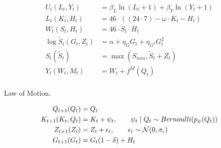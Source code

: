 \begin{align}
    U_t(L_t, Y_t) &= \beta_L \ln(L_t + 1) + \beta_Y \ln(Y_t + 1) \label{eq:utility_v1}\\
    L_t(K_t, H_t) &= 46 \cdot ((24 \cdot 7) - \omega \cdot K_t  - H_t) \label{eq:leissure_v1}\\
    W_t(S_t, H_t) &= 46 \cdot S_t \cdot H_t \label{eq:wage_v1}\\
    \log \tilde{S}_t (G_t, Z_t) &= \alpha + \eta_G G_t + \eta_{G^2} G_t^2 \label{eq:salary_tilde_v1}\\
    S_t(\tilde{S}_t) &= \max(S_{min} , \tilde{S}_t  + Z_t)  \label{eq:salary_v1}\\
    Y_t(W_t, M_t) &= W_t + f^M(Q_t) \label{eq:total_salary_v1}\\
\end{align}


Law of Motion.

\begin{align}
    Q_{t+1}(Q_t) &= Q_t \label{eq:age_v1}\\
    K_{t+1}(K_t, Q_t)  &= K_{t} + \psi_t, \qquad \psi_t \mid Q_t \sim Bernoulli(p_\psi(Q_t)) \label{eq:fertility_v1} \\
    Z_{t+1}(Z_t) &= Z_t + \epsilon_t, \qquad \epsilon_t \sim \mathcal{N}(0, \sigma_\epsilon) \label{eq:idiosyncratic_wage_path_v1}\\
    G_{t+1}(G_t) &= G_t(1 - \delta) + H_t \\
\end{align}



